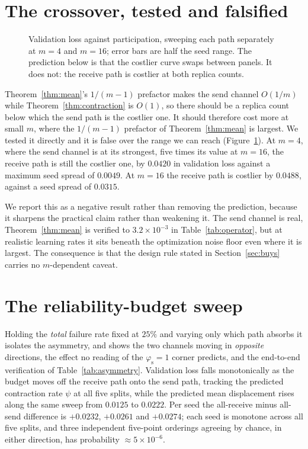 \documentclass{article}
\theoremstyle{plain}
\newcommand{\ps}{\varphi_{\mathrm{s}}}
\begin{document}
\section{The crossover, tested and falsified}\label{app:crossover}
\begin{figure}[t]
    \centering
    
    \caption{Validation loss against participation, sweeping each path
separately at $m{=}4$ and $m{=}16$; error bars are half the seed range. The
prediction below is that the costlier curve swaps between panels. It does not:
the receive path is costlier at both replica counts.}
    \label{fig:crossover}
\end{figure}

Theorem~\ref{thm:mean}'s $1/(m{-}1)$ prefactor makes the send channel $O(1/m)$
while Theorem~\ref{thm:contraction} is $O(1)$, so there should be a replica
count below which the send path is the costlier one. It should therefore cost
more at small $m$, where the $1/(m{-}1)$ prefactor of Theorem~\ref{thm:mean} is
largest. We tested it directly and it is false over the range we can reach
(Figure~\ref{fig:crossover}).
At $m{=}4$, where the send channel is at its strongest, five times its value
at $m{=}16$, the receive path is still the costlier one, by $0.0420$ in
validation loss against a maximum seed spread of $0.0049$. At $m{=}16$ the
receive path is costlier by $0.0488$, against a seed spread of $0.0315$.

We report this as a negative result rather than removing the prediction,
because it sharpens the practical claim rather than weakening it. The send
channel is real, Theorem~\ref{thm:mean} is verified to
$3.2\times10^{-3}$ in Table~\ref{tab:operator}, but at realistic learning
rates it sits beneath the optimization noise floor even where it is largest.
The consequence is that the design rule stated in Section~\ref{sec:buys}
carries no $m$-dependent caveat.

\section{The reliability-budget sweep}\label{app:budget}

Holding the \emph{total} failure rate fixed at $25\%$ and varying only which path
absorbs it isolates the asymmetry, and shows the two channels moving in
\emph{opposite} directions, the effect no reading of the $\ps{=}1$ corner
predicts, and the end-to-end verification of Table~\ref{tab:asymmetry}. Validation loss
falls monotonically as the budget moves off the receive path onto the send path,
tracking the predicted contraction rate $\psi$ at all five splits, while the
predicted mean displacement rises along the same sweep from $0.0125$ to $0.0222$.
Per seed the all-receive minus all-send difference is $+0.0232$, $+0.0261$ and
$+0.0274$; each seed is monotone across all five splits, and three independent
five-point orderings agreeing by chance, in either direction, has
probability ${\approx}5\times10^{-6}$.
\end{document}
